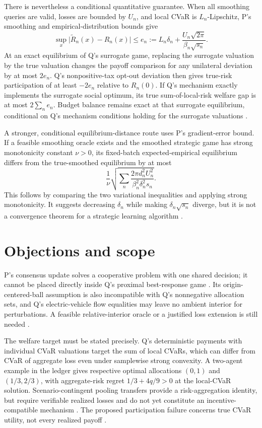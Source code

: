 \documentclass{article}
\begin{document}
There is nevertheless a conditional quantitative guarantee. When all smoothing queries are valid, losses are bounded by \(U_n\), and local CVaR is \(L_n\)-Lipschitz, P's smoothing and empirical-distribution bounds give
\[
\sup_x\lvert\widetilde R_n(x)-R_n(x)\rvert
\le e_n
:=L_n\delta_n+
\frac{U_n\sqrt{2\pi}}{\beta_n\sqrt{s_n}}.
\]
At an exact equilibrium of Q's surrogate game, replacing the surrogate valuation by the true valuation changes the payoff comparison for any unilateral deviation by at most \(2e_n\). Q's nonpositive-tax opt-out deviation then gives true-risk participation of at least \(-2e_n\) relative to \(R_n(0)\). If Q's mechanism exactly implements the surrogate social optimum, its true sum-of-local-risk welfare gap is at most \(2\sum_n e_n\). Budget balance remains exact at that surrogate equilibrium, conditional on Q's mechanism conditions holding for the surrogate valuations .

A stronger, conditional equilibrium-distance route uses P's gradient-error bound. If a feasible smoothing oracle exists and the smoothed strategic game has strong monotonicity constant \(\nu>0\), its fixed-batch expected-empirical equilibrium differs from the true-smoothed equilibrium by at most
\[
\frac{1}{\nu}
\sqrt{\sum_n
\frac{2\pi d_n^2U_n^2}
{\beta_n^2\delta_n^2s_n}}.
\]
This follows by comparing the two variational inequalities and applying strong monotonicity. It suggests decreasing \(\delta_n\) while making \(\delta_n\sqrt{s_n}\) diverge, but it is not a convergence theorem for a strategic learning algorithm .

\section{Objections and scope}

P's consensus update solves a cooperative problem with one shared decision; it cannot be placed directly inside Q's proximal best-response game . Its origin-centered-ball assumption is also incompatible with Q's nonnegative allocation sets, and Q's electric-vehicle flow equalities may leave no ambient interior for perturbations. A feasible relative-interior oracle or a justified loss extension is still needed .

The welfare target must be stated precisely. Q's deterministic payments with individual CVaR valuations target the sum of local CVaRs, which can differ from CVaR of aggregate loss even under samplewise strong convexity. A two-agent example in the ledger gives respective optimal allocations \((0,1)\) and \((1/3,2/3)\), with aggregate-risk regret \(1/3+4q/9>0\) at the local-CVaR solution. Scenario-contingent pooling transfers provide a risk-aggregation identity, but require verifiable realized losses and do not yet constitute an incentive-compatible mechanism . The proposed participation failure concerns true CVaR utility, not every realized payoff .
\end{document}
